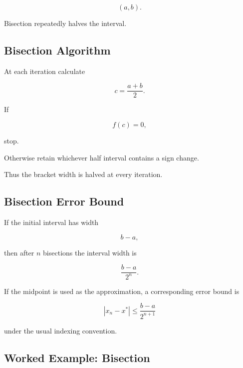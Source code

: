 \[
(a,b).
\]

Bisection repeatedly halves the interval.

\subsection{Bisection Algorithm}
\label{subsec:bisection-algorithm}

At each iteration calculate

\[
\boxed{
c
=
\frac{a+b}{2}.
}
\]

If

\[
f(c)=0,
\]

stop.

Otherwise retain whichever half interval contains a sign change.

Thus the bracket width is halved at every iteration.

\subsection{Bisection Error Bound}
\label{subsec:bisection-error}

If the initial interval has width

\[
b-a,
\]

then after \(n\) bisections the interval width is

\[
\boxed{
\frac{
b-a
}{
2^n
}.
}
\]

If the midpoint is used as the approximation, a corresponding error bound
is

\[
\boxed{
|x_n-x^*|
\leq
\frac{
b-a
}{
2^{n+1}
}
}
\]

under the usual indexing convention.

\subsection{Worked Example: Bisection}
\label{subsec:worked-bisection}

